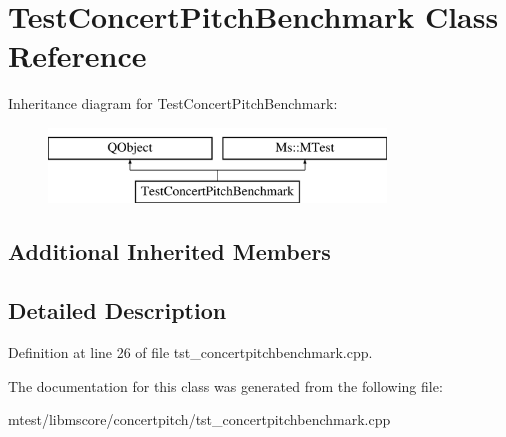 \hypertarget{class_test_concert_pitch_benchmark}{}\section{Test\+Concert\+Pitch\+Benchmark Class Reference}
\label{class_test_concert_pitch_benchmark}
Inheritance diagram for Test\+Concert\+Pitch\+Benchmark\+:\begin{figure}[H]
\begin{center}
\leavevmode
\includegraphics[height=2.000000cm]{class_test_concert_pitch_benchmark}
\end{center}
\end{figure}
\subsection*{Additional Inherited Members}


\subsection{Detailed Description}


Definition at line 26 of file tst\+\_\+concertpitchbenchmark.\+cpp.



The documentation for this class was generated from the following file\+:\begin{DoxyCompactItemize}
\item 
mtest/libmscore/concertpitch/tst\+\_\+concertpitchbenchmark.\+cpp\end{DoxyCompactItemize}
